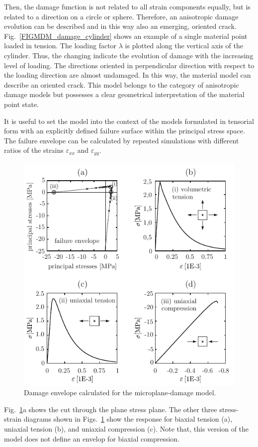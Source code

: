 \documentclass[main.tex]{subfiles}
\begin{document}
Then, the damage function is not related to all strain components equally, but is related to a direction on a circle or sphere.
Therefore, an anisotropic damage evolution can be described and in this way also an emerging, oriented crack.
Fig.~\ref{FIGMDM_damage_cylinder} shows an example of a single material point loaded in tension. The loading factor $\lambda$ is plotted along the vertical axis of the cylinder. Thus, the changing indicate the evolution of damage with the increasing level of loading. The directions oriented in perpendicular direction with respect to the loading direction are almost undamaged. In this way, the material model can describe an oriented crack.
This model belongs to the category of anisotropic damage models but possesses a clear geometrical interpretation of the material point state.

It is useful to set the model into the context of the models formulated in tensorial form with an explicitly defined failure surface within the principal stress space. The failure envelope can be calculated by repeated simulations with different ratios of the strains $\varepsilon_{xx}$ and $\varepsilon_{yy}$.
\begin{figure}
\centering
\includegraphics[width=12cm]{fig/Damage_envelope.pdf}
\caption{Damage envelope calculated for the microplane-damage model.}
\label{FIGMDM_damage_envelope}
\end{figure}
Fig.~\ref{FIGMDM_damage_envelope}a shows the cut through the plane stress plane. The other three stress-strain diagrams shown in Figs.~\ref{FIGMDM_damage_envelope} show the response for biaxial tension (a), uniaxial tension (b), and uniaxial compression (c). Note that, this version of the model does not define an envelop for biaxial compression. 
\end{document}
